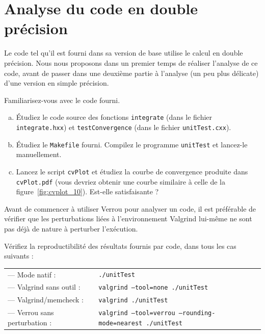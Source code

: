 \documentclass[a4paper]{article}
\newcounter{Question}
\newenvironment{question}[1][\unskip]{
  \bigskip
  \stepcounter{Question}
  \def\questionTitle{ #1}
  \begin{mdframed}[style=question]
  }{
  \end{mdframed}
}
\begin{document}
\newpage

\section{Analyse du code en double précision}

Le code tel qu'il est fourni dans sa version de base utilise le calcul en double
précision. Nous nous proposons dans un premier temps de réaliser l'analyse de ce
code, avant de passer dans une deuxième partie à l'analyse (un peu plus
délicate) d'une version en simple précision.

\begin{question}
  Familiarisez-vous avec le code fourni.
  \begin{enumerate}[(a)]
  \item Étudiez le code source des fonctions \texttt{integrate} (dans le
    fichier \texttt{integrate.hxx}) et \texttt{testConvergence} (dans le fichier
    \texttt{unitTest.cxx}).
  \item Étudiez le \texttt{Makefile} fourni. Compilez le programme
    \texttt{unitTest} et lancez-le manuellement.
  \item Lancez le script \texttt{cvPlot} et étudiez la courbe de convergence
    produite dans \texttt{cvPlot.pdf} (vous devriez obtenir une courbe similaire
    à celle de la figure~\ref{fig:cvplot_10}). Est-elle satisfaisante ?
  \end{enumerate}
\end{question}

\bigskip

Avant de commencer à utiliser Verrou pour analyser un code, il est préférable de
vérifier que les perturbations liées à l'environnement Valgrind lui-même ne sont
pas déjà de nature à perturber l'exécution.

\begin{question}
  Vérifiez la reproductibilité des résultats fournis par code, dans tous les cas
  suivants :\\
  \begin{tabular}{ll}
    --- Mode natif :          & \tt ./unitTest\\
    --- Valgrind sans outil : & \tt valgrind --tool=none ./unitTest\\
    --- Valgrind/memcheck :   & \tt valgrind ./unitTest\\
    --- Verrou sans perturbation : & \tt valgrind --tool=verrou
                                     --rounding-mode=nearest ./unitTest
  \end{tabular}
\end{question}
\end{document}
